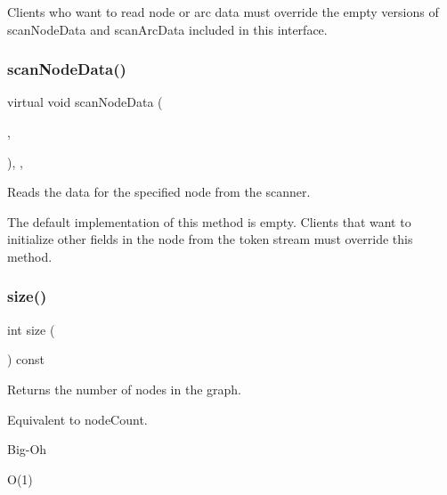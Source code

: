 Clients who want to read node or arc data must override the empty versions of {\ttfamily scan\+Node\+Data} and {\ttfamily scan\+Arc\+Data} included in this interface. \mbox{\label{classGraph_a0fc2ca3535b7bff7759aa0c1d35ff08b}} 
\subsubsection{\texorpdfstring{scan\+Node\+Data()}{scanNodeData()}}
{\footnotesize\ttfamily virtual void scan\+Node\+Data (\begin{DoxyParamCaption}\item[{\mbox{\hyperlink{classTokenScanner}{Token\+Scanner}} \&}]{,  }\item[{\mbox{\hyperlink{classVertexGen}{Vertex\+Gen}}$<$ V, E $>$  $\ast$}]{ }\end{DoxyParamCaption})\hspace{0.3cm}{\ttfamily [inline]}, {\ttfamily [virtual]}, {\ttfamily [inherited]}}



Reads the data for the specified node from the scanner. 

The default implementation of this method is empty. Clients that want to initialize other fields in the node from the token stream must override this method. \mbox{\label{classGraph_af9593d4a5ff4274efaf429cb4f9e57cc}} 
\subsubsection{\texorpdfstring{size()}{size()}}
{\footnotesize\ttfamily int size (\begin{DoxyParamCaption}{ }\end{DoxyParamCaption}) const\hspace{0.3cm}{\ttfamily [inherited]}}



Returns the number of nodes in the graph. 

Equivalent to node\+Count. \begin{DoxyRefDesc}{Big-\/\+Oh}
\item[\mbox{\hyperlink{BigOh__BigOh000089}{Big-\/\+Oh}}]O(1) \end{DoxyRefDesc}
\mbox{\label{classBasicGraphGen_a66498d3675a5bc08fa30a032d41764f7}} 
